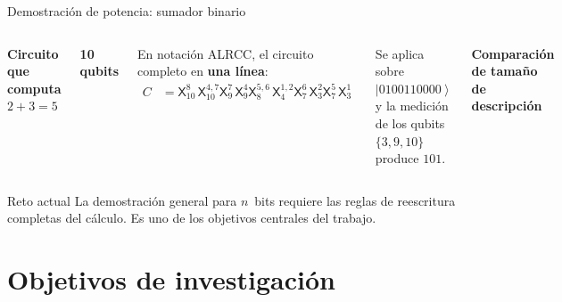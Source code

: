 \documentclass[12pt, aspectratio=169]{beamer}
\newcommand{\qg}[1]{\mathsf{#1}}
\newcommand{\stategate}[3]{\qg{#1}^{#2}_{#3}}
\newcommand{\ket}[1]{\left|#1\right\rangle}
\begin{document}
\begin{frame}{Demostración de potencia: sumador binario}
  \begin{columns}[T]
    \textbf{Circuito que computa $2 + 3 = 5$}

    \textbf{10 qubits}

    \medskip
    En notación ALRCC, el circuito completo en \textbf{una línea}:
    \begin{align*}
      C & = \stategate{X}{8}{10}\,\stategate{X}{4,7}{10}
      \stategate{X}{7}{9}\,\stategate{X}{4}{9}
      \stategate{X}{5,6}{8}\,\stategate{X}{1,2}{4}
      \stategate{X}{6}{7}\,\stategate{X}{2}{3}
      \stategate{X}{5}{7}\,\stategate{X}{1}{3}
    \end{align*}

    Se aplica sobre $\ket{0100110000}$ y la medición de los
    qubits $\{3,9,10\}$ produce $101$.

    \textbf{Comparación de tamaño de descripción}

  \end{columns}
  \begin{alertblock}{Reto actual}
    \small
    La demostración general para $n$~bits requiere las
    reglas de reescritura completas del cálculo.
    Es uno de los objetivos centrales del trabajo.
  \end{alertblock}
\end{frame}

\section{Objetivos de investigación}
\end{document}
